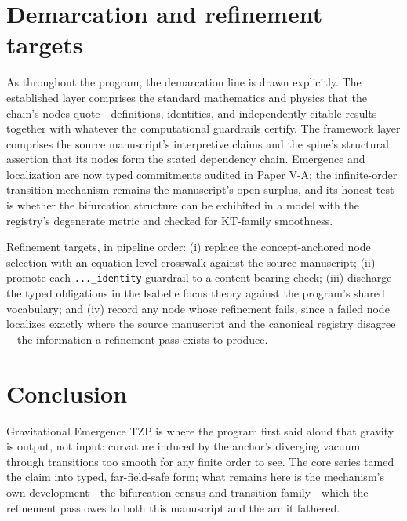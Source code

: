 \documentclass[11pt]{article}
\theoremstyle{remark}
\begin{document}
\section{Demarcation and refinement targets}
\label{sec:demarc}

As throughout the program, the demarcation line is drawn explicitly. The established layer comprises the standard mathematics and physics that the chain's nodes quote---definitions, identities, and independently citable results---together with whatever the computational guardrails certify. The framework layer comprises the source manuscript's interpretive claims and the spine's structural assertion that its nodes form the stated dependency chain. Emergence and localization are now typed commitments audited in Paper V-A; the infinite-order transition mechanism remains the manuscript's open surplus, and its honest test is whether the bifurcation structure can be exhibited in a model with the registry's degenerate metric and checked for KT-family smoothness.

Refinement targets, in pipeline order: (i) replace the concept-anchored node selection with an equation-level crosswalk against the source manuscript; (ii) promote each \texttt{...\_identity} guardrail to a content-bearing check; (iii) discharge the typed obligations in the Isabelle focus theory against the program's shared vocabulary; and (iv) record any node whose refinement fails, since a failed node localizes exactly where the source manuscript and the canonical registry disagree---the information a refinement pass exists to produce.

\section{Conclusion}
\label{sec:conc}

Gravitational Emergence TZP is where the program first said aloud that gravity is output, not input: curvature induced by the anchor's diverging vacuum through transitions too smooth for any finite order to see. The core series tamed the claim into typed, far-field-safe form; what remains here is the mechanism's own development---the bifurcation census and transition family---which the refinement pass owes to both this manuscript and the arc it fathered.
\end{document}

